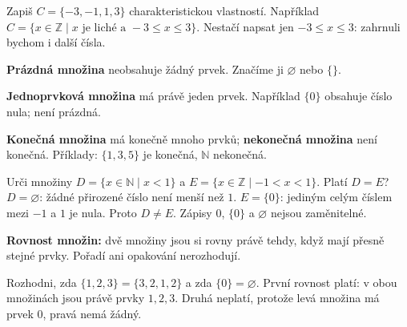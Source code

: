 \documentclass[11pt,a4paper]{article}
\begin{document}
\begin{prikladReseniBox}[title={Příklad 2}]
Zapiš $C=\{-3,-1,1,3\}$ charakteristickou vlastností.
\tcblower
Například $C=\{x\in\mathbb Z\mid x\text{ je liché a }-3\le x\le3\}$.
Nestačí napsat jen $-3\le x\le3$: zahrnuli bychom i další čísla.
\end{prikladReseniBox}

\begin{definiceBox}[title={Definice - Prázdná množina}]
\textbf{Prázdná množina} neobsahuje žádný prvek. Značíme ji
$\varnothing$ nebo $\{\}$.
\end{definiceBox}
\begin{definiceBox}[title={Definice - Jednoprvková množina}]
\textbf{Jednoprvková množina} má právě jeden prvek. Například
$\{0\}$ obsahuje číslo nula; není prázdná.
\end{definiceBox}
\begin{definiceBox}[title={Definice - Konečná a nekonečná množina}]
\textbf{Konečná množina} má konečně mnoho prvků; \textbf{nekonečná množina}
není konečná. Příklady: $\{1,3,5\}$ je konečná, $\mathbb N$ nekonečná.
\end{definiceBox}

\begin{prikladReseniBox}[title={Příklad 3}]
Urči množiny $D=\{x\in\mathbb N\mid x<1\}$ a
$E=\{x\in\mathbb Z\mid -1<x<1\}$. Platí $D=E$?
\tcblower
$D=\varnothing$: žádné přirozené číslo není menší než $1$.
$E=\{0\}$: jediným celým číslem mezi $-1$ a $1$ je nula.
Proto $D\ne E$. Zápisy $0$, $\{0\}$ a $\varnothing$ nejsou zaměnitelné.
\end{prikladReseniBox}

\begin{definiceBox}[title={Definice - Rovnost množin}]
\textbf{Rovnost množin:} dvě množiny jsou si rovny právě tehdy,
když mají přesně stejné prvky. Pořadí ani opakování nerozhodují.
\end{definiceBox}
\begin{prikladReseniBox}[title={Příklad 4}]
Rozhodni, zda $\{1,2,3\}=\{3,2,1,2\}$ a zda
$\{0\}=\varnothing$.
\tcblower
První rovnost platí: v obou množinách jsou právě prvky $1,2,3$.
Druhá neplatí, protože levá množina má prvek $0$, pravá nemá žádný.
\end{prikladReseniBox}
\end{document}
